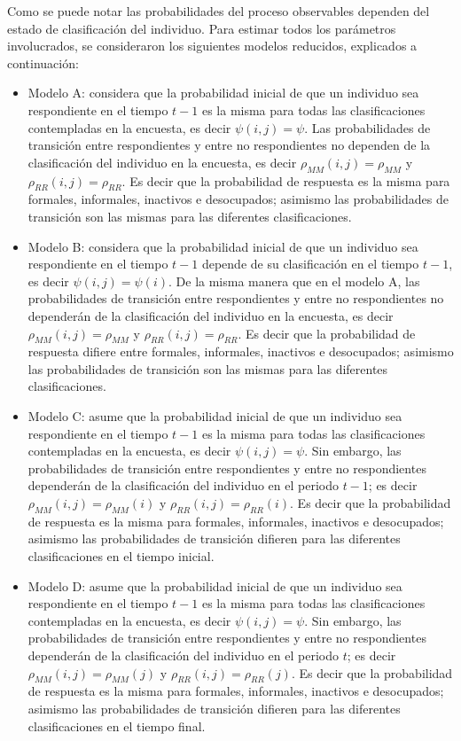 \documentclass[
  10pt,
  spanish,
]{book}
\providecommand{\tightlist}{%
  \setlength{\itemsep}{0pt}\setlength{\parskip}{0pt}}
\begin{document}
Como se puede notar las probabilidades del proceso observables dependen del estado de clasificación del individuo. Para estimar todos los parámetros involucrados, se consideraron los siguientes modelos reducidos, explicados a continuación:

\begin{itemize}
\tightlist
\item
  Modelo A: considera que la probabilidad inicial de que un individuo sea respondiente en el tiempo \(t-1\) es la misma para todas las clasificaciones contempladas en la encuesta, es decir \(\psi(i,j)=\psi\). Las probabilidades de transición entre respondientes y entre no respondientes no dependen de la clasificación del individuo en la encuesta, es decir \(\rho_{MM}(i,j)=\rho_{MM}\) y \(\rho_{RR}(i,j)=\rho_{RR}\). Es decir que la probabilidad de respuesta es la misma para formales, informales, inactivos e desocupados; asimismo las probabilidades de transición son las mismas para las diferentes clasificaciones.
\item
  Modelo B: considera que la probabilidad inicial de que un individuo sea respondiente en el tiempo \(t-1\) depende de su clasificación en el tiempo \(t-1\), es decir \(\psi(i,j)=\psi(i)\). De la misma manera que en el modelo A, las probabilidades de transición entre respondientes y entre no respondientes no dependerán de la clasificación del individuo en la encuesta, es decir \(\rho_{MM}(i,j)=\rho_{MM}\) y \(\rho_{RR}(i,j)=\rho_{RR}\). Es decir que la probabilidad de respuesta difiere entre formales, informales, inactivos e desocupados; asimismo las probabilidades de transición son las mismas para las diferentes clasificaciones.
\item
  Modelo C: asume que la probabilidad inicial de que un individuo sea respondiente en el tiempo \(t-1\) es la misma para todas las clasificaciones contempladas en la encuesta, es decir \(\psi(i,j)=\psi\). Sin embargo, las probabilidades de transición entre respondientes y entre no respondientes dependerán de la clasificación del individuo en el periodo \(t-1\); es decir \(\rho_{MM}(i,j)=\rho_{MM}(i)\) y \(\rho_{RR}(i,j)=\rho_{RR}(i)\). Es decir que la probabilidad de respuesta es la misma para formales, informales, inactivos e desocupados; asimismo las probabilidades de transición difieren para las diferentes clasificaciones en el tiempo inicial.
\item
  Modelo D: asume que la probabilidad inicial de que un individuo sea respondiente en el tiempo \(t-1\) es la misma para todas las clasificaciones contempladas en la encuesta, es decir \(\psi(i,j)=\psi\). Sin embargo, las probabilidades de transición entre respondientes y entre no respondientes dependerán de la clasificación del individuo en el periodo \(t\); es decir \(\rho_{MM}(i,j)=\rho_{MM}(j)\) y \(\rho_{RR}(i,j)=\rho_{RR}(j)\). Es decir que la probabilidad de respuesta es la misma para formales, informales, inactivos e desocupados; asimismo las probabilidades de transición difieren para las diferentes clasificaciones en el tiempo final.
\end{itemize}
\end{document}
